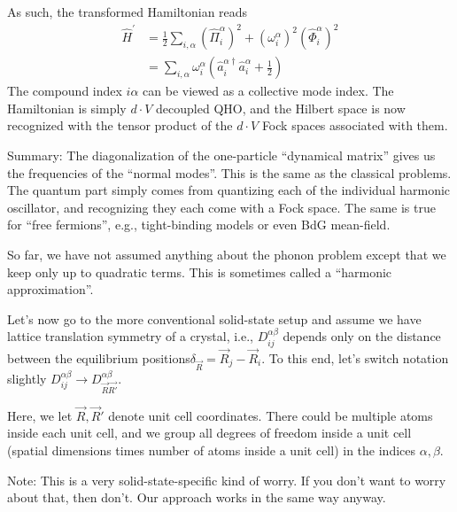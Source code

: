 As such, the transformed Hamiltonian reads
\begin{align*}
    \hat{H}^{\prime}&=\frac{1}{2}\sum_{i,\alpha}{\left( \hat{\Pi}_{i}^{\alpha} \right) ^2+\left( \omega _{i}^{\alpha} \right) ^2\left( \hat{\Phi}_{i}^{\alpha} \right) ^2}\\
    &=\sum_{i,\alpha}{\omega _{i}^{\alpha}\left( \hat{a}_{i}^{\alpha \dagger}\hat{a}_{i}^{\alpha}+\frac{1}{2} \right)}
\end{align*}
The compound index $i\alpha$ can be viewed as a collective mode index. The Hamiltonian is simply $d\cdot V$ decoupled QHO, and the Hilbert space is now recognized with the tensor product of the $d\cdot V$ Fock spaces associated with them.

Summary: The diagonalization of the one-particle ``dynamical matrix'' gives us the frequencies of the ``normal modes''. This is the same as the classical problems. The quantum part simply comes from quantizing each of the individual harmonic oscillator, and recognizing they each come with a Fock space. The same is true for ``free fermions'', e.g., tight-binding models or even BdG mean-field.

So far, we have not assumed anything about the phonon problem except that we keep only up to quadratic terms. This is sometimes called a ``harmonic approximation''.

Let's now go to the more conventional solid-state setup and assume we have lattice translation symmetry of a crystal, i.e., $D_{ij}^{\alpha\beta}$ depends only on the distance between the equilibrium positions$\delta_{\vec{R}}=\vec{R}_j-\vec{R}_i$. To this end, let's switch notation slightly $D_{ij}^{\alpha\beta}\to D_{\vec{R}\vec{R'}}^{\alpha\beta}$.

Here, we let $\vec{R},\vec{R}'$ denote unit cell coordinates. There could be multiple atoms inside each unit cell, and we group all degrees of freedom inside a unit cell (spatial dimensions times number of atoms inside a unit cell) in the indices $\alpha,\beta$.

Note: This is a very solid-state-specific kind of worry. If you don't want to worry about that, then don't. Our approach works in the same way anyway.

